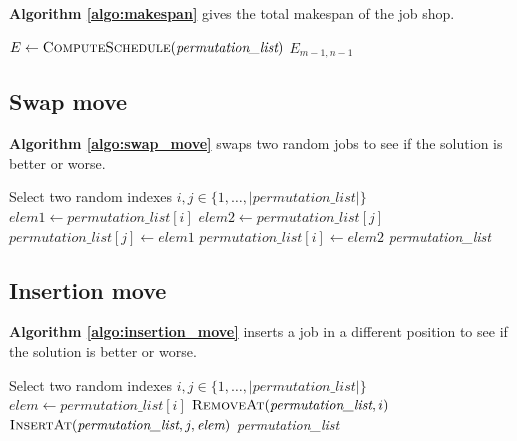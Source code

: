 \textbf{Algorithm \ref{algo:makespan}} gives the total makespan of the job shop.

\begin{algorithm}[H]
\caption{Makespan}
\label{algo:makespan}
\begin{algorithmic}[1]

    \Statex
        \Statex
        \State $E \gets \text{\textsc{ComputeSchedule}}(\textit{permutation\_list})$
        \State \Return $E_{m-1,n-1}$
    \EndFunction

\end{algorithmic}
\end{algorithm}

\newpage
\subsection{Swap move}

\textbf{Algorithm \ref{algo:swap_move}} swaps two random jobs to see if the solution is better or worse.

\begin{algorithm}[!htbp]
\caption{Swap move}
\label{algo:swap_move}
\begin{algorithmic}[1]

    \Statex
        \Statex
        \State Select two random indexes $i, j \in \{1, \dots, |\textit{permutation\_list}|\}$
        \Statex
        \State $\textit{elem1} \gets \textit{permutation\_list}[i]$
        \State $\textit{elem2} \gets \textit{permutation\_list}[j]$
        \Statex
        \State $\textit{permutation\_list}[j] \gets \textit{elem1}$
        \State $\textit{permutation\_list}[i] \gets \textit{elem2}$
        \State \Return \textit{permutation\_list}
    \EndFunction

\end{algorithmic}
\end{algorithm}

\subsection{Insertion move}

\textbf{Algorithm \ref{algo:insertion_move}} inserts a job in a different position to see if the solution is better or worse.

\begin{algorithm}[H]
\caption{Insertion move}
\label{algo:insertion_move}
\begin{algorithmic}[1]

    \Statex
        \Statex
        \State Select two random indexes $i, j \in \{1, \dots, |\textit{permutation\_list}|\}$      
        \State $\textit{elem} \gets \textit{permutation\_list}[i]$
        \State $\Call{RemoveAt}{\textit{permutation\_list}, i}$
        \State $\Call{InsertAt}{\textit{permutation\_list}, j, \textit{elem}}$
        \State \Return \textit{permutation\_list}
    \EndFunction

\end{algorithmic}
\end{algorithm}

